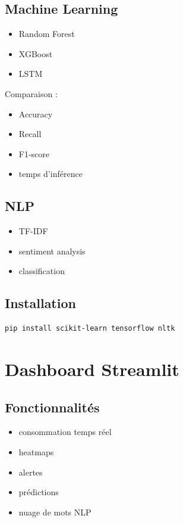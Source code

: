 \documentclass[1pt,a4paper]{report}
\begin{document}
\subsection{Machine Learning}

\begin{itemize}
    \item Random Forest
    \item XGBoost
    \item LSTM
\end{itemize}

Comparaison :

\begin{itemize}
    \item Accuracy
    \item Recall
    \item F1-score
    \item temps d’inférence
\end{itemize}

\subsection{NLP}

\begin{itemize}
    \item TF-IDF
    \item sentiment analysis
    \item classification
\end{itemize}

\subsection{Installation}

\begin{verbatim}
pip install scikit-learn tensorflow nltk
\end{verbatim}

\section{Dashboard Streamlit}

\subsection{Fonctionnalités}

\begin{itemize}
    \item consommation temps réel
    \item heatmaps
    \item alertes
    \item prédictions
    \item nuage de mots NLP
\end{itemize}
\end{document}

